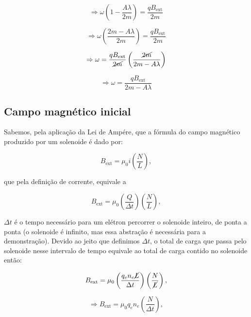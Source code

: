 \documentclass[
	article,
	11pt,
	oneside,
	a4paper,
	english,
	brazil,
	sumario=tradicional
	]{abntex2}
\begin{document}
\begin{equation}
    \Rightarrow \omega \left(1 - \frac{A\lambda}{2m} \right)= \frac{qB_{\text{ext}}}{2m}
\end{equation}

\begin{equation}
    \Rightarrow \omega \left(\frac{2m - A\lambda}{2m} \right)= \frac{qB_{\text{ext}}}{2m}
\end{equation}

\begin{equation}
    \Rightarrow \omega = \frac{qB_{\text{ext}}}{\cancel{2m}}\left(\frac{\cancel{2m}}{2m - A\lambda} \right)
\end{equation}

\begin{equation}
    \Rightarrow \boxed{\omega = \frac{qB_{\text{ext}}}{2m - A\lambda}}
\end{equation}

\subsection{Campo magnético inicial}

Sabemos, pela aplicação da Lei de Ampére, que a fórmula do campo magnético produzido por um solenoide é dado por:


\begin{equation}
    B_{\text{ext}} = \mu_0 i \left(\frac{N}{L}\right),
\end{equation}

\noindent que pela definição de corrente, equivale a

\begin{equation}
    B_{\text{ext}} = \mu_0 \left(\frac{Q}{\Delta t}\right) \left(\frac{N}{L}\right),
\end{equation}

\noindent $\Delta t$ é o tempo necessário para um elétron percorrer o solenoide inteiro, de ponta a ponta (o solenoide é infinito, mas essa abstração é necessária para a demonstração). Devido ao jeito que definimos $\Delta t$, o total de carga que passa pelo solenoide nesse intervalo de tempo equivale ao total de carga contido no solenoide então:

\begin{equation}
    B_{\text{ext}} = \mu_0 \left(\frac{q_e n_e \cancel{L}}{\Delta t}\right) \left(\frac{N}{\cancel{L}}\right),
\end{equation}

\begin{equation}
    \Rightarrow B_{\text{ext}} = \mu_0 q_e n_e \left(\frac{N}{\Delta t}\right),
\end{equation}
\end{document}
